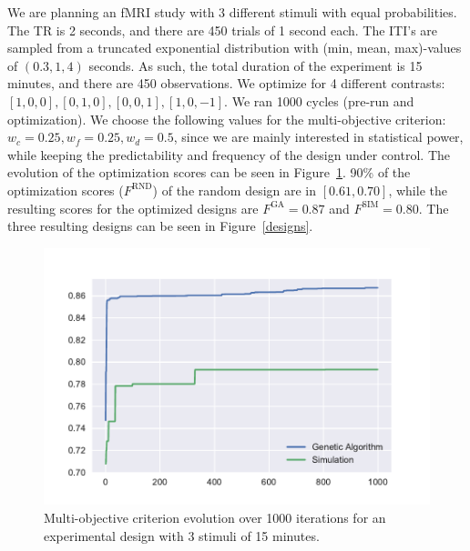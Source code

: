 \documentclass[article]{jss}
\begin{document}
We are planning an fMRI study with 3 different stimuli with equal
probabilities.  The TR is 2 seconds, and there are 450 trials of 1
second each.  The ITI's are sampled from a truncated exponential
distribution with (min, mean, max)-values of $(0.3,1,4)$ seconds.  As
such, the total duration of the experiment is 15 minutes, and there
are 450 observations.  We optimize for 4 different contrasts:
$[1,0,0], [0,1,0], [0,0,1], [1,0,-1]$.  We ran 1000 cycles (pre-run
and optimization).  We choose the following values for the
multi-objective criterion: $w_c = 0.25, w_f = 0.25, w_d = 0.5$, since
we are mainly interested in statistical power, while keeping the
predictability and frequency of the design under control.  The
evolution of the optimization scores can be seen in Figure~\ref{scores}.  90\% of the optimization scores ($F^{\text{RND}}$) of
the random design are in $[0.61, 0.70]$, while the resulting scores
for the optimized designs are $F^{\text{GA}}=0.87$ and
$F^{\text{SIM}}=0.80$.  The three resulting designs can be seen in
Figure~\ref{designs}.
%
\begin{figure}[t!]
\centering
\includegraphics[scale=0.35, trim = 0 10 0 30, clip]{test_scores.pdf}
\caption{Multi-objective criterion evolution over 1000 iterations for an experimental design with 3 stimuli of 15 minutes.\label{scores}}
\end{figure}
%
\end{document}
